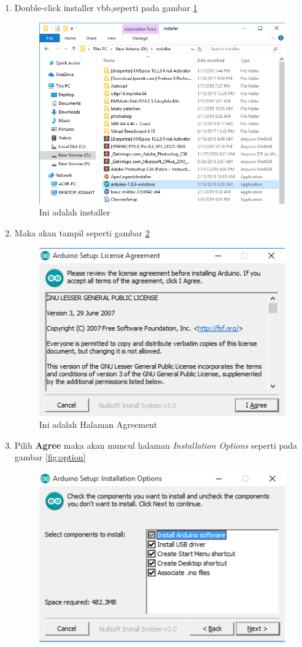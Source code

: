 \begin{enumerate}
\begin{enumerate}
            \item Double-click installer vbb,seperti pada gambar \ref{fig:installer}
                \begin{figure}[!htbp]
                \centering
                \includegraphics[width=.75\textwidth]{figures/IDE/installer.png}
                \caption{Ini adalah installer}\label{fig:installer}
                \end{figure}
            \item Maka akan tampil seperti gambar \ref{fig:agreement}
                \begin{figure}[!htbp]
                \centering
                \includegraphics[width=.75\textwidth]{figures/IDE/agreement.png}
                \caption{Ini adalah Halaman Agreement}\label{fig:agreement}
                \end{figure}
            \item Pilih \textbf{Agree} maka akan muncul halaman \textit{Installation Options} seperti pada gambar \ref{fig:option}
                \begin{figure}[!htbp]
                \centering
                \includegraphics[width=.75\textwidth]{figures/IDE/option.png}

\end{figure}
\end{enumerate}
\end{enumerate}
